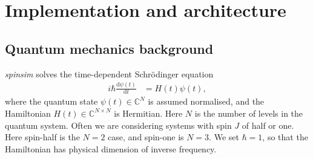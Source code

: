 \documentclass{jors}
\begin{document}
\section{Implementation and architecture}
	\subsection{Quantum mechanics background}
		\emph{spinsim} solves the time-dependent Schr\"{o}dinger equation
		\begin{align}
			i\hbar\frac{\mathrm{d}\psi(t)}{\mathrm{d}t} &= H(t)\psi(t),\label{eq:schroedinger}
		\end{align}
		where the quantum state \(\psi(t) \in \mathbb{C}^N\) is assumed normalised, and the Hamiltonian \(H(t) \in \mathbb{C}^{N \times N}\) is Hermitian.
		Here \(N\) is the number of levels in the quantum system.
		Often we are considering systems with spin \(J\) of half or one.
		Here spin-half is the \(N = 2\) case, and spin-one is \(N = 3\).
		We set \(\hbar = 1\), so that the Hamiltonian has physical dimension of inverse frequency.
		
		
\end{document}
